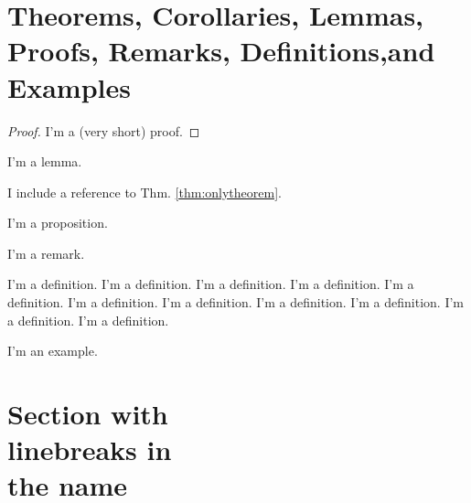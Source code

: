 \section[Theorems, Corollaries, Lemmas, Proofs, Remarks, Definitions and Examples]{Theorems, Corollaries, Lemmas, Proofs, Remarks, Definitions,and Examples}

\begin{theorem}
\label{thm:onlytheorem}
\blindtext
\end{theorem}

\begin{proof}
I'm a (very short) proof.
\end{proof}

\begin{lemma}
I'm a lemma.
\end{lemma}

\begin{corollary}
I include a reference to Thm. \ref{thm:onlytheorem}.
\end{corollary}

\begin{proposition}
I'm a proposition.
\end{proposition}

\begin{remark}
I'm a remark. 
\end{remark}

\begin{definition}
I'm a definition. I'm a definition. I'm a definition. I'm a definition. I'm a definition. I'm a definition. I'm a definition. I'm a definition. I'm a definition. I'm a definition. I'm a definition. 
\end{definition}

\begin{example}
I'm an example.
\end{example}


\section[Optional table of contents heading]{Section with\\ linebreaks in\\the
name}


\Blindtext[2]




